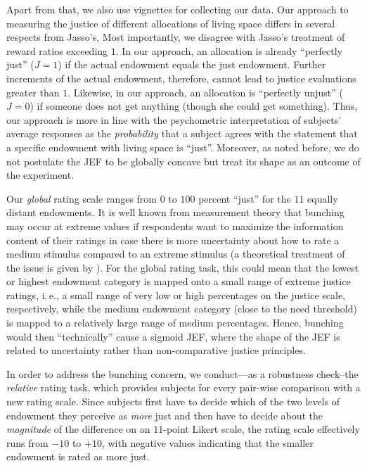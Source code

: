 \documentclass[12pt]{scrartcl}
\begin{document}
Apart from that, we also use vignettes for collecting our data.
Our approach to measuring the justice of different allocations of living space differs in several respects from Jasso's.
Most importantly, we disagree with Jasso's treatment of reward ratios exceeding $1$.
In our approach, an allocation is already ``perfectly just'' ($J=1$) if the actual endowment equals the just endowment.
Further increments of the actual endowment, therefore, cannot lead to justice evaluations greater than $1$.
Likewise, in our approach, an allocation is ``perfectly unjust'' ($J=0$) if someone does not get anything (though she could get something).
Thus, our approach is more in line with the psychometric interpretation of subjects' average responses as the \textit{probability} that a subject agrees with the statement that a specific endowment with living space is ``just''.
Moreover, as noted before, we do not postulate the JEF to be globally concave but treat its shape as an outcome of the experiment.

Our \textit{global} rating scale ranges from $0$ to $100$ percent ``just'' for the $11$ equally distant endowments.
It is well known from measurement theory that bunching may occur at extreme values \citep[e.\,g.,][]{mickes_strong_2011} if respondents want to maximize the information content of their ratings in case there is more uncertainty about how to rate a medium stimulus compared to an extreme stimulus (a theoretical treatment of the issue is given by \citealt[p.~1652ff]{seidl_how_1994}).
For the global rating task, this could mean that the lowest or highest endowment category is mapped onto a small range of extreme justice ratings, i.\,e., a small range of very low or high percentages on the justice scale, respectively, while the medium endowment category (close to the need threshold) is mapped to a relatively large range of medium percentages.
Hence, bunching would then ``technically'' cause a sigmoid JEF, where the shape of the JEF is related to uncertainty rather than non-comparative justice principles.

In order to address the bunching concern, we conduct---as a robustness check--the \textit{relative} rating task, which provides subjects for every pair-wise comparison with a new rating scale.
Since subjects first have to decide which of the two levels of endowment they perceive as \textit{more} just and then have to decide about the \textit{magnitude} of the difference on an $11$-point Likert scale, the rating scale effectively runs from $-10$ to $+10$, with negative values indicating that the smaller endowment is rated as more just.
\end{document}
